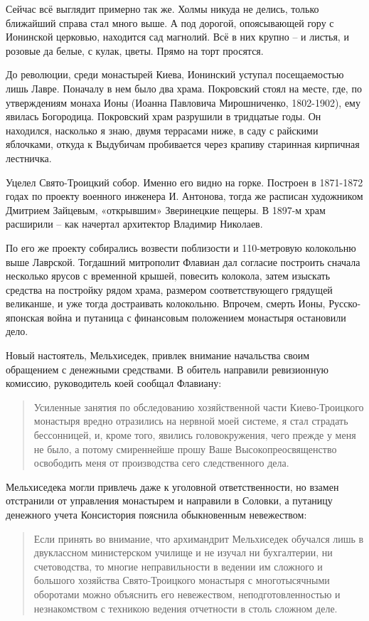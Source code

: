 Сейчас всё выглядит примерно так же. Холмы никуда не делись, только ближайший справа стал много выше. А под дорогой, опоясывающей гору с Ионинской церковью, находится сад магнолий. Всё в них крупно – и листья, и розовые да белые, с кулак, цветы. Прямо на торт просятся.

До революции, среди монастырей Киева, Ионинский уступал посещаемостью лишь Лавре. Поначалу в нем было два храма. Покровский стоял на месте, где, по утверждениям монаха Ионы (Иоанна Павловича Мирошниченко, 1802-1902), ему явилась Богородица. Покровский храм разрушили в тридцатые годы. Он находился, насколько я знаю, двумя террасами ниже, в саду с райскими яблочками, откуда к Выдубичам пробивается через крапиву старинная кирпичная лестничка.

Уцелел Свято-Троицкий собор. Именно его видно на горке. Построен в 1871-1872 годах по проекту военного инженера И. Антонова, тогда же расписан художником Дмитрием Зайцевым, «открывшим» Зверинецкие пещеры. В 1897-м храм расширили – как начертал архитектор Владимир Николаев.

По его же проекту собирались возвести поблизости и 110-метровую колокольню выше Лаврской. Тогдашний митрополит Флавиан дал согласие построить сначала несколько ярусов с временной крышей, повесить колокола, затем изыскать средства на постройку рядом храма, размером соответствующего грядущей великанше, и уже тогда достраивать колокольню. Впрочем, смерть Ионы, Русско-японская война и путаница с финансовым положением монастыря остановили дело.

Новый настоятель, Мельхиседек, привлек внимание начальства своим обращением с денежными средствами. В обитель направили ревизионную комиссию, руководитель коей сообщал Флавиану:

\begin{quotation}
Усиленные занятия по обследованию хозяйственной части Киево-Троицкого монастыря вредно отразились на нервной моей системе, я стал страдать бессонницей, и, кроме того, явились головокружения, чего прежде у меня не было, а потому смиреннейше прошу Ваше Высокопреосвященство освободить меня от производства сего следственного дела.
\end{quotation}

Мельхиседека могли привлечь даже к уголовной ответственности, но взамен отстранили от управления монастырем и направили в Соловки, а путаницу  денежного учета Консистория пояснила обыкновенным невежеством:

\begin{quotation}
Если принять во внимание, что архимандрит Мельхиседек обучался лишь в двуклассном министерском училище и не изучал ни бухгалтерии, ни счетоводства, то многие неправильности в ведении им сложного и большого хозяйства Свято-Троицкого монастыря с многотысячными оборотами можно объяснить его невежеством, неподготовленностью и незнакомством с техникою ведения отчетности в столь сложном деле.
\end{quotation}

